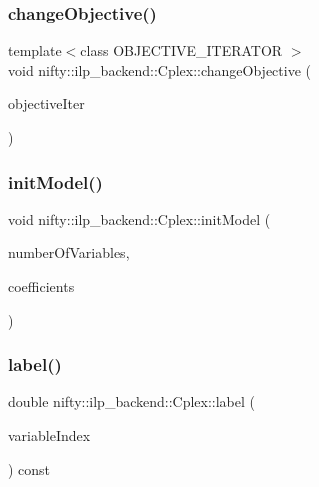 \subsubsection{\texorpdfstring{change\+Objective()}{changeObjective()}}
{\footnotesize\ttfamily template$<$class O\+B\+J\+E\+C\+T\+I\+V\+E\+\_\+\+I\+T\+E\+R\+A\+T\+OR $>$ \\
void nifty\+::ilp\+\_\+backend\+::\+Cplex\+::change\+Objective (\begin{DoxyParamCaption}\item[{O\+B\+J\+E\+C\+T\+I\+V\+E\+\_\+\+I\+T\+E\+R\+A\+T\+OR}]{objective\+Iter }\end{DoxyParamCaption})\hspace{0.3cm}{\ttfamily [inline]}}

\mbox{\label{classnifty_1_1ilp__backend_1_1Cplex_a52a0ed3e137e56d17daaaf4542d3290c}} 
\subsubsection{\texorpdfstring{init\+Model()}{initModel()}}
{\footnotesize\ttfamily void nifty\+::ilp\+\_\+backend\+::\+Cplex\+::init\+Model (\begin{DoxyParamCaption}\item[{const size\+\_\+t}]{number\+Of\+Variables,  }\item[{const double $\ast$}]{coefficients }\end{DoxyParamCaption})\hspace{0.3cm}{\ttfamily [inline]}}

\mbox{\label{classnifty_1_1ilp__backend_1_1Cplex_ab15c34e1113706d59f1d795d877942a9}} 
\subsubsection{\texorpdfstring{label()}{label()}}
{\footnotesize\ttfamily double nifty\+::ilp\+\_\+backend\+::\+Cplex\+::label (\begin{DoxyParamCaption}\item[{const size\+\_\+t}]{variable\+Index }\end{DoxyParamCaption}) const\hspace{0.3cm}{\ttfamily [inline]}}

